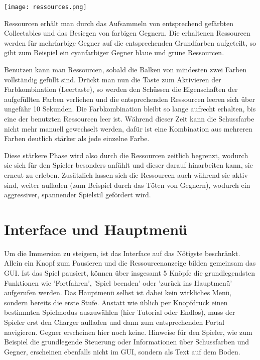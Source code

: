 \texttt{[image: ressources.png]}

Ressourcen erhält man durch das Aufsammeln von entsprechend gefärbten Collectables und das Besiegen von farbigen Gegnern. Die erhaltenen Ressourcen werden für mehrfarbige Gegner auf die entsprechenden Grundfarben aufgeteilt, so gibt zum Beispiel ein cyanfarbiger Gegner blaue und grüne Ressourcen.

Benutzen kann man Ressourcen, sobald die Balken von mindesten zwei Farben vollständig gefüllt sind. Drückt man nun die Taste zum Aktivieren der Farbkombination (Leertaste), so werden den Schüssen die Eigenschaften der aufgefüllten Farben verliehen und die entsprechenden Ressourcen leeren sich über ungefähr 10 Sekunden. Die Farbkombination bleibt so lange aufrecht erhalten, bis eine der benutzten Ressourcen leer ist. Während dieser Zeit kann die Schussfarbe nicht mehr manuell gewechselt werden, dafür ist eine Kombination aus mehreren Farben deutlich stärker als jede einzelne Farbe.

Diese stärkere Phase wird also durch die Ressourcen zeitlich begrenzt, wodurch sie sich für den Spieler besonders anfühlt und dieser darauf hinarbeiten kann, sie erneut zu erleben. Zusätzlich lassen sich die Ressourcen auch während sie aktiv sind, weiter aufladen (zum Beispiel durch das Töten von Gegnern), wodurch ein aggressiver, spannender Spielstil gefördert wird.



\section{Interface und Hauptmenü}

Um die Immersion zu steigern, ist das Interface auf das Nötigste beschränkt. Allein ein Knopf zum Pausieren und die Ressourcenanzeige bilden gemeinsam das GUI. Ist das Spiel pausiert, können über insgesamt 5 Knöpfe die grundlegendsten Funktionen wie 'Fortfahren', 'Spiel beenden' oder 'zurück ins Hauptmenü' aufgerufen werden. 
Das Hauptmenü selbst ist dabei kein wirkliches Menü, sondern bereits die erste Stufe. Anstatt wie üblich per Knopfdruck einen bestimmten Spielmodus auszuwählen (hier Tutorial oder Endlos), muss der Spieler erst den Charger aufladen und dann zum entsprechenden Portal navigieren. Gegner erscheinen hier noch keine. Hinweise für den Spieler, wie zum Beispiel die grundlegende Steuerung oder Informationen über Schussfarben und Gegner, erscheinen ebenfalls nicht im GUI, sondern als Text auf dem Boden. 

